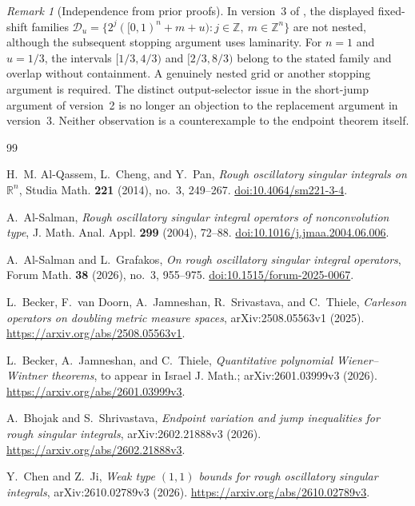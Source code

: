 \documentclass[11pt]{article}
\numberwithin{equation}{section}
\theoremstyle{remark}
\newtheorem{remark}[theorem]{Remark}
\theoremstyle{definition}
\begin{document}
\begin{remark}[Independence from prior proofs]
In version~3 of \cite[\S2.2.2]{BhojakShrivastava}, the displayed
fixed-shift families
$\mathcal D_u=\{2^j([0,1)^n+m+u):j\in\mathbb Z,\ m\in\mathbb Z^n\}$
are not nested, although the subsequent stopping argument uses
laminarity. For $n=1$ and $u=1/3$, the intervals $[1/3,4/3)$ and
$[2/3,8/3)$ belong to the stated family and overlap without containment.
A genuinely nested grid or another stopping argument is required.
The distinct output-selector issue in the short-jump argument of
version~2 is no longer an objection to the replacement argument in
version~3. Neither observation is a counterexample to the endpoint
theorem itself.
\end{remark}


\clearpage

\begin{thebibliography}{99}

H.~M. Al-Qassem, L.~Cheng, and Y.~Pan,
\emph{Rough oscillatory singular integrals on $\mathbb R^n$},
Studia Math. \textbf{221} (2014), no.~3, 249--267.
\href{https://doi.org/10.4064/sm221-3-4}
{doi:10.4064/sm221-3-4}.

A.~Al-Salman,
\emph{Rough oscillatory singular integral operators of nonconvolution type},
J. Math. Anal. Appl. \textbf{299} (2004), 72--88.
\href{https://doi.org/10.1016/j.jmaa.2004.06.006}
{doi:10.1016/j.jmaa.2004.06.006}.

A.~Al-Salman and L.~Grafakos,
\emph{On rough oscillatory singular integral operators},
Forum Math. \textbf{38} (2026), no.~3, 955--975.
\href{https://doi.org/10.1515/forum-2025-0067}
{doi:10.1515/forum-2025-0067}.


L.~Becker, F.~van Doorn, A.~Jamneshan, R.~Srivastava, and C.~Thiele,
\emph{Carleson operators on doubling metric measure spaces},
arXiv:2508.05563v1 (2025).
\url{https://arxiv.org/abs/2508.05563v1}.

L.~Becker, A.~Jamneshan, and C.~Thiele,
\emph{Quantitative polynomial Wiener--Wintner theorems},
to appear in Israel J. Math.; arXiv:2601.03999v3 (2026).
\url{https://arxiv.org/abs/2601.03999v3}.

A.~Bhojak and S.~Shrivastava,
\emph{Endpoint variation and jump inequalities for rough singular integrals},
arXiv:2602.21888v3 (2026).
\url{https://arxiv.org/abs/2602.21888v3}.


Y.~Chen and Z.~Ji,
\emph{Weak type $(1,1)$ bounds for rough oscillatory singular integrals},
arXiv:2610.02789v3 (2026).
\url{https://arxiv.org/abs/2610.02789v3}.


\end{thebibliography}
\end{document}
